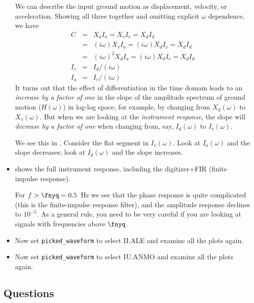 \documentclass[11pt,titlepage,fleqn]{article}
\begin{document}
\begin{itemize}
We can describe the input ground motion as displacement, velocity, or acceleration. Showing all three together and omitting explicit $\omega$ dependence, we have
%
\begin{eqnarray}
C &=& X_a I_a = X_v I_v =  X_d I_d 
\\
&=& (i\omega) X_v I_a = (i\omega) X_d I_v =  X_d I_d 
\\
&=& (i\omega)^2 X_d I_a = (i\omega) X_d I_v =  X_d I_d 
\\
I_v &=& I_d / (i\omega)
\\
I_a &=& I_v / (i\omega)
\end{eqnarray}
%
It turns out that the effect of differentiation in the time domain leads to an {\em increase by a factor of one} in the slope of the amplitude spectrum of ground motion ($H(\omega)$) in log-log space, for example, by changing from $X_d(\omega)$ to $X_v(\omega)$. But when we are looking at the {\em instrument response}, the slope will {\em decrease by a factor of one} when changing from, say, $I_d(\omega)$ to $I_v(\omega)$.

We see this in . Consider the flat segment in $I_v(\omega)$. Look at $I_a(\omega)$ and the slope decreases; look at $I_d(\omega)$ and the slope increases.


\item {} shows the full instrument response, including the digitizer+FIR (finite impulse response).

For $f > \fnyq = 0.5$~Hz we see that the phase response is quite complicated (this is the finite-impulse response filter), and the amplitude response declines to $10^{-5}$. As a general rule, you need to be very careful if you are looking at signals with frequencies above $\fnyq$.

\item Now set \verb+picked_waveform+ to select II.ALE and examine all the plots again.

\item Now set \verb+picked_waveform+ to select IU.ANMO and examine all the plots again.

\end{itemize}


\subsection*{Questions}
\end{document}
